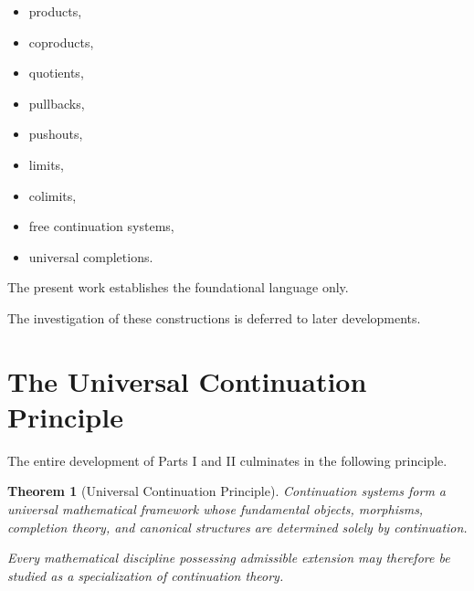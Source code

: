 \documentclass[13pt,openany]{book}
\theoremstyle{plain}
\newtheorem{theorem}{Theorem}[chapter]
\theoremstyle{definition}
\begin{document}
\begin{itemize}

\item products,

\item coproducts,

\item quotients,

\item pullbacks,

\item pushouts,

\item limits,

\item colimits,

\item free continuation systems,

\item universal completions.

\end{itemize}

The present work establishes the foundational language only.

The investigation of these constructions is deferred to later developments.


\section{The Universal Continuation Principle}

The entire development of Parts I and II culminates in the following principle.

\begin{theorem}[Universal Continuation Principle]

Continuation systems form a universal mathematical framework whose fundamental
objects, morphisms, completion theory, and canonical structures are determined
solely by continuation.

Every mathematical discipline possessing admissible extension may therefore be
studied as a specialization of continuation theory.

\end{theorem}
\end{document}
